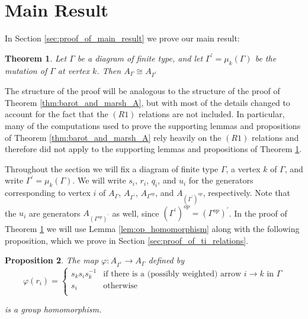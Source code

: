 \documentclass[11pt]{amsart}
\newtheorem{thm}{Theorem}[section]
\newtheorem{prop}[thm]{Proposition}
\theoremstyle{definition}
\begin{document}
\section{Main Result}\label{sec:main_result}
\noindent In Section \ref{sec:proof_of_main_result} we prove our main result:

\begin{thm}\label{thm:main}
Let $\Gamma$ be a diagram of finite type, and let $\Gamma^{\prime} = \mu_k(\Gamma)$ be the mutation of $\Gamma$ at vertex $k$. Then $A_{\Gamma} \cong A_{\Gamma^{\prime}}$
\end{thm}


The structure of the proof will be analogous to the structure of the proof of Theorem \ref{thm:barot_and_marsh_A}, but with most of the details changed to account for the fact that the $(R1)$ relations are not included.  In particular, many of the computations used to prove the supporting lemmas and propositions of Theorem \ref{thm:barot_and_marsh_A} rely heavily on the $(R1)$ relations and therefore did not apply to the supporting lemmas and propositions of Theorem \ref{thm:main}.

Throughout the section we will fix a diagram of finite type $\Gamma$, a vertex $k$ of $\Gamma$, and write $\Gamma^{\prime} = \mu_k(\Gamma)$.  We will write $s_i$, $r_i$, $q_i$, and $u_i$ for the generators corresponding to vertex $i$ of $A_{\Gamma}$, $A_{\Gamma^\prime}$, $A_{\Gamma^{op}}$, and $A_{\left(\Gamma^\prime\right)^{op}}$, respectively. Note that the $u_i$ are generators $A_{\left(\Gamma^{op}\right)^\prime}$ as well, since $\left(\Gamma^\prime\right)^{op} = \left(\Gamma^{op}\right)^\prime$.  In the proof of Theorem \ref{thm:main} we will use Lemma \ref{lem:op_homomorphism} along with the following proposition, which we prove in Section \ref{sec:proof_of_ti_relations}.


\begin{prop}\label{prop:ti_relations}
The map $\varphi \colon A_{\Gamma^\prime}\rightarrow A_{\Gamma}$ defined by
\begin{displaymath}
\varphi(r_i) = \begin{cases} s_ks_is_k^{-1} & \mbox{if there is a (possibly weighted) arrow } i \rightarrow k \mbox{ in } \Gamma\\
s_i & \mbox{otherwise}\\
\end{cases}
\end{displaymath}

\noindent is a group homomorphism.
\end{prop}
\end{document}
